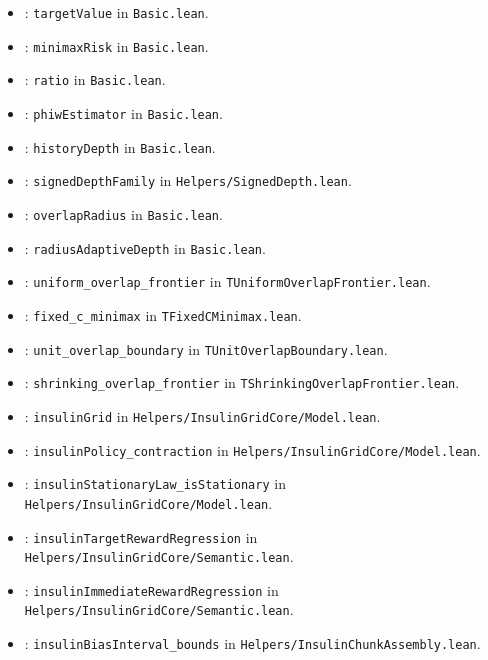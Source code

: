 \begin{itemize}
\item {}: \texttt{targetValue} in \texttt{Basic.lean}.
\item {}: \texttt{minimaxRisk} in \texttt{Basic.lean}.
\item {}: \texttt{ratio} in \texttt{Basic.lean}.
\item {}: \texttt{phiwEstimator} in \texttt{Basic.lean}.
\item {}: \texttt{historyDepth} in \texttt{Basic.lean}.
\item {}: \texttt{signedDepthFamily} in \texttt{Helpers/SignedDepth.lean}.
\item {}: \texttt{overlapRadius} in \texttt{Basic.lean}.
\item {}: \texttt{radiusAdaptiveDepth} in \texttt{Basic.lean}.
\item {}: \texttt{uniform\_overlap\_frontier} in \texttt{TUniformOverlapFrontier.lean}.
\item {}: \texttt{fixed\_c\_minimax} in \texttt{TFixedCMinimax.lean}.
\item {}: \texttt{unit\_overlap\_boundary} in \texttt{TUnitOverlapBoundary.lean}.
\item {}: \texttt{shrinking\_overlap\_frontier} in \texttt{TShrinkingOverlapFrontier.lean}.
\item {}: \texttt{insulinGrid} in \texttt{Helpers/InsulinGridCore/Model.lean}.
\item {}: \texttt{insulinPolicy\_contraction} in \texttt{Helpers/InsulinGridCore/Model.lean}.
\item {}: \texttt{insulinStationaryLaw\_isStationary} in \texttt{Helpers/InsulinGridCore/Model.lean}.
\item {}: \texttt{insulinTargetRewardRegression} in \texttt{Helpers/InsulinGridCore/Semantic.lean}.
\item {}: \texttt{insulinImmediateRewardRegression} in \texttt{Helpers/InsulinGridCore/Semantic.lean}.
\item {}: \texttt{insulinBiasInterval\_bounds} in \texttt{Helpers/InsulinChunkAssembly.lean}.

\end{itemize}
